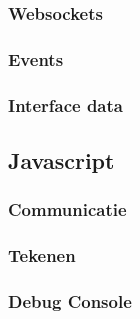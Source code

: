 \documentclass[a4paper]{report}
\begin{document}
\subsubsection{Websockets}
\subsubsection{Events}
\subsubsection{Interface data}
\subsection{Javascript}
\subsubsection{Communicatie}
\subsubsection{Tekenen}
\subsubsection{Debug Console}

\newpage


\end{document}
